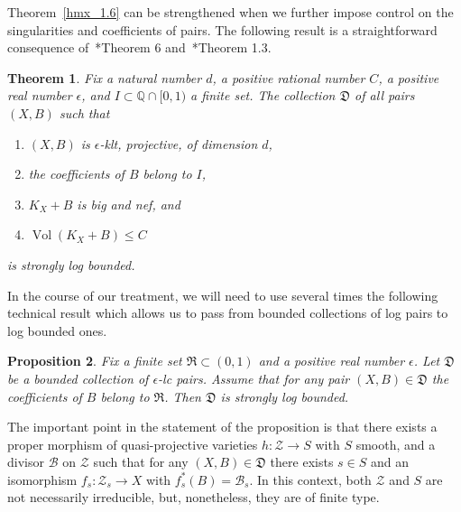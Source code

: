 \documentclass[11pt]{ip-journal}
\newtheorem{theorem}{Theorem}[section]
\newtheorem{proposition}[theorem]{Proposition}
\theoremstyle{definition}
\DeclareMathOperator{\Vol}{\mathrm{Vol}}
\begin{document}
Theorem~\ref{hmx_1.6} can be strengthened when we further impose control on the singularities and coefficients of pairs.
The following result is a straightforward consequence of~\cite{1610.08932}*{Theorem 6} and~\cite{1804.10971}*{Theorem 1.3}.

\begin{theorem}
\label{mst+fil.thm}
Fix a natural number $d$, a positive rational number $C$, a positive real number $\epsilon$, and $I \subset \mathbb{Q} \cap [0, 1)$ a finite set.
The collection $\mathfrak{D}$ of all pairs $(X, B)$ such that
\begin{enumerate}
    \item 
$(X, B)$ is $\epsilon$-klt, 
projective, of dimension 
$d$,
    
    \item
the coefficients of 
$B$ belong to 
$I$,
    
    \item
$K_X+B$ 
is big and nef, and  
    
    \item
$\Vol(K_X+B) \leq C$
\end{enumerate}
is strongly log bounded.
\end{theorem}

In the course of our treatment, we will need to use several times the following technical result which allows us to pass from bounded collections of log pairs to log bounded ones.

\begin{proposition}
\label{fam.good.prop}
Fix a finite set 
$\mathfrak{R} \subset (0, 1)$ 
and a positive real number 
$\epsilon$.
Let 
$\mathfrak{D}$ 
be a bounded collection of 
$\epsilon$-lc 
pairs.
Assume that for any pair 
$(X, B) \in \mathfrak{D}$ 
the coefficients of 
$B$ 
belong to 
$\mathfrak{R}$. 
Then 
$\mathfrak{D}$ 
is strongly log bounded.
\end{proposition}

The important point in the statement of the proposition is that there exists a proper morphism of quasi-projective varieties $h \colon \mathcal{Z} \to S$ with $S$ smooth, and a divisor $\mathcal{B}$ on $\mathcal{Z}$ such that for any $(X, B) \in \mathfrak{D}$ there exists $s \in S$ and an isomorphism $f_s \colon \mathcal Z_s \to X$ with $f_s^\ast(B) =\mathcal{B}_s$.
In this context, both $\mathcal Z$ and $S$ are not necessarily irreducible, but, nonetheless, they are of finite type.
\end{document}

